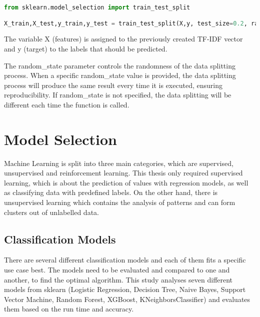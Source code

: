 \begin{lstlisting}[language=Python, caption=Train-Test-Split in Python, label=lst:train-test-split]
from sklearn.model_selection import train_test_split

X_train,X_test,y_train,y_test = train_test_split(X,y, test_size=0.2, random_state=42)
\end{lstlisting}

The variable X (features) is assigned to the previously created TF-IDF vector and y (target) to the labels that should be predicted. 

The random\_state parameter controls the randomness of the data splitting process. When a specific random\_state value is provided, the data splitting process will produce the same result every time it is executed, ensuring reproducibility. If random\_state is not specified, the data splitting will be different each time the function is called.

\section{Model Selection}

Machine Learning is split into three main categories, which are supervised, unsupervised and reinforcement learning. This thesis only required supervised learning, which is about the prediction of values with regression models, as well as classifying data with predefined labels. On the other hand, there is unsupervised learning which contains the analysis of patterns and can form clusters out of unlabelled data.

\subsection{Classification Models}

There are several different classification models and each of them fits a specific use case best. 
The models need to be evaluated and compared to one and another, to find the optimal algorithm. This study analyses seven different models from sklearn (Logistic Regression, Decision Tree, Naive Bayes, Support Vector Machine, Random Forest, XGBoost, KNeighborsClassifier) and evaluates them based on the run time and accuracy. 

